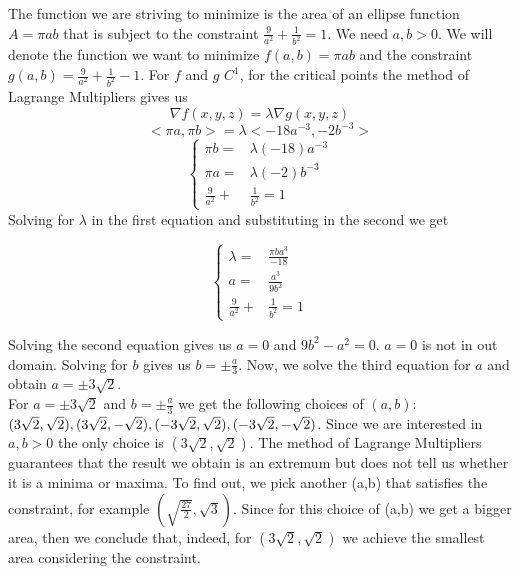 \documentclass[]{article}
\begin{document}
The function we are striving to minimize is the area of an ellipse function $A=\pi ab$ that is subject to the constraint
$\frac{9}{a^2} + \frac{1}{b^2} = 1$. We need $a,b>0$. We will denote the function we want to minimize $f(a,b)=\pi ab$
and the constraint $g(a,b)=\frac{9}{a^2} + \frac{1}{b^2}-1$. For $f$ and $g$ $C^1$, for the critical points the method of Lagrange Multipliers gives us
$$    
    \nabla f(x,y,z) = \lambda \nabla g(x,y,z)
$$
$$
    <\pi a, \pi b> = \lambda <-18a^{-3}, -2b^{-3}>
$$
\begin{equation*}
    \left\{
    \begin{alignedat}{3}
        \pi b= &\lambda(-18)a^{-3} \\
        \pi a= &\lambda (-2)b^{-3} \\
        \frac{9}{a^2} +& \frac{1}{b^2} = 1
    \end{alignedat}
    \right.
\end{equation*}
Solving for $\lambda$ in the first equation and substituting in the second we get

\begin{equation*}
    \left\{
    \begin{alignedat}{3}
        \lambda= &\frac{\pi ba^{3}}{-18} \\
        a= & \frac{a^3}{9b^2} \\
        \frac{9}{a^2} +& \frac{1}{b^2} = 1
    \end{alignedat}
    \right.
\end{equation*}

Solving the second equation gives us $a=0$ and $9b^2-a^2=0$. $a=0$ is not in out domain. Solving for $b$ gives us $b=\pm \frac{a}{3}$.
Now, we solve the third equation for $a$ and obtain $a=\pm 3\sqrt{2}$.\\
For $a=\pm 3\sqrt{2}$ and $b=\pm \frac{a}{3}$ we get the following choices of $(a,b)$: $(3\sqrt{2}, \sqrt{2}),\\
(3\sqrt{2}, -\sqrt{2}), (-3\sqrt{2}, \sqrt{2}), (-3\sqrt{2}, -\sqrt{2})$.
Since we are interested in $a,b>0$ the only choice is $(3\sqrt{2}, \sqrt{2})$.
The method of Lagrange Multipliers guarantees that the result we obtain is an extremum but does not tell us
whether it is a minima or maxima. To find out, we pick another (a,b) that satisfies the constraint, for example $(\sqrt{\frac{27}{2}},\sqrt{3})$. Since for this choice of (a,b) we get a bigger area, then we conclude that, indeed, for $(3\sqrt{2}, \sqrt{2})$
we achieve the smallest area considering the constraint.
\end{document}
